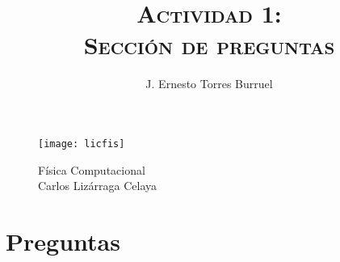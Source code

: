 \documentclass[12pt]{article}
\title{\huge \textbf{\textsc{Actividad 1:\\ Sección de preguntas}}}%
\author{J. Ernesto Torres Burruel}
\begin{document}
\begin{titlepage}%
\begin{figure}[h]
    \centering
    \texttt{[image: licfis]}
    {\huge \maketitle}
    {\large Física Computacional\\Carlos Lizárraga Celaya}
\end{figure}

\thispagestyle{empty}%

\end{titlepage}

\newpage

\section{Preguntas}
\end{document}
